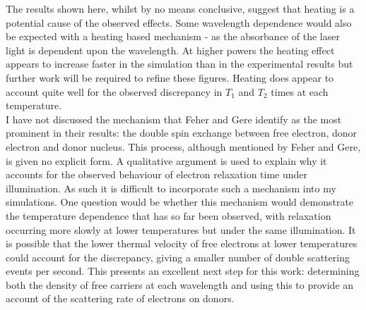 The results shown here, whilst by no means conclusive, suggest that heating is a potential cause of the observed effects.
Some wavelength dependence would also be expected with a heating based mechanism - as the absorbance of the laser light is dependent upon the wavelength.
At higher powers the heating effect appears to increase faster in the simulation than in the experimental results but further work will be required to refine these figures.
Heating does appear to account quite well for the observed discrepancy in $T_1$ and $T_2$ times at each temperature.
\\
I have not discussed the mechanism that Feher and Gere identify as the most prominent in their results: the double spin exchange between free electron, donor electron and donor nucleus.
This process, although mentioned by Feher and Gere, is given no explicit form.
A qualitative argument is used to explain why it accounts for the observed behaviour of electron relaxation time under illumination.
As such it is difficult to incorporate such a mechanism into my simulations.
One question would be whether this mechanism would demonstrate the temperature dependence that has so far been observed, with relaxation occurring more slowly at lower temperatures but under the same illumination.
It is possible that the lower thermal velocity of free electrons at lower temperatures could account for the discrepancy, giving a smaller number of double scattering events per second.
This presents an excellent next step for this work: determining both the density of free carriers at each wavelength and using this to provide an account of the scattering rate of electrons on donors.
